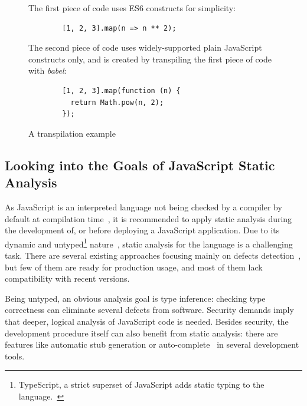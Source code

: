 \vspace{1em}
\begin{figure}[!htb]
	\centering
	\begin{minipage}{25em}
		The first piece of code uses ES6 constructs for simplicity:

		\begin{verbatim}
		[1, 2, 3].map(n => n ** 2);
		\end{verbatim}

		The second piece of code uses widely-supported plain JavaScript constructs only, and is created by transpiling the first piece of code with \emph{babel}:

		\begin{verbatim}
		[1, 2, 3].map(function (n) {
		  return Math.pow(n, 2);
		});
		\end{verbatim}
	\end{minipage}
  \caption{A transpilation example}
  \label{fig:transpiling-example}
\end{figure}


\subsection{Looking into the Goals of JavaScript Static Analysis}

As JavaScript is an interpreted language not being checked by a compiler by default at compilation time~\cite{373902}, it is recommended to apply static analysis during the development of, or before deploying a JavaScript application. Due to its dynamic and untyped\footnote{TypeScript, a strict superset of JavaScript adds static typing to the language.~\cite{typescript-website}} nature~\cite{flanagan2006javascript}, static analysis for the language is a challenging task. There are several existing approaches focusing mainly on defects detection~\cite{madsen2013practical, livshits2010gulfstream, jensen2009type}, but few of them are ready for production usage, and most of them lack compatibility with recent \es versions.

Being untyped, an obvious analysis goal is type inference: checking type correctness can eliminate several defects from software. Security demands imply that deeper, logical analysis of JavaScript code is needed. Besides security, the development procedure itself can also benefit from static analysis: there are features like automatic stub generation or auto-complete~\cite{madsen2013practical} in several development tools.~\cite{esprima-autocomplete, webstorm-autocomplete}


